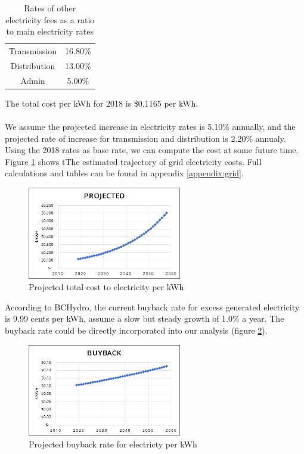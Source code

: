 \documentclass[10pt,letterpaper]{article}
\begin{document}
\begin{table}[H]
	\centering
	\begin{tabular}{|c c|}
		\hline
		Transmission&16.80\%\\
		Distribution&13.00\%\\
		Admin&5.00\%\\
		\hline
	\end{tabular}
	\caption{Rates of other electricity fees as a ratio to main electricity rates}
	\label{table:grid-fees}
\end{table}

The total cost per kWh for 2018 is \$0.1165 per kWh.\\
\\
We assume the projected increase in electricity rates is 5.10\% annually, and the projected rate of increase for transmission and distribution is 2.20\% annualy.\cite{transmission-projection} Using the 2018 rates as base rate, we can compute the cost at some future time. Figure \ref{fig:grid-projection} shows tThe estimated trajectory of grid electricity costs. Full calculations and tables can be found in appendix \ref{appendix:grid}.

\begin{figure}[H]
	\centering
	\includegraphics[width=0.6\textwidth]{assets/1534567789488}
	\caption{Projected total cost to electricity per kWh}
	\label{fig:grid-projection}
\end{figure}

According to BCHydro, the current buyback rate for excess generated electricity is 9.99 cents per kWh\cite{bchydro-buyback}, assume a slow but steady growth of 1.0\% a year. The buyback rate could be directly incorporated into our analysis (figure \ref{fig:grid-buyback}).

\begin{figure}[H]
	\centering
	\includegraphics[width=0.6\textwidth]{assets/1534567834603}
	\caption{Projected buyback rate for electricty per kWh}
	\label{fig:grid-buyback}
\end{figure}
\end{document}
